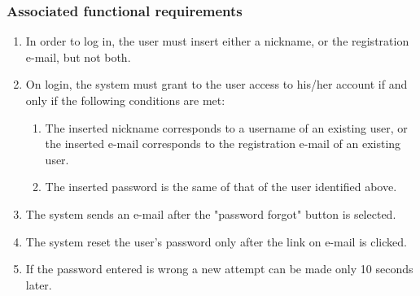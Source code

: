 \subsubsection{Associated functional requirements}
\begin{enumerate}
    \item In order to log in, the user must insert either a nickname, or the registration e-mail, but not both.
    \item On login, the system must grant to the user access to his/her account if and only if the following conditions are met:
    \begin{enumerate} 
    	\item The inserted nickname corresponds to a username of an existing user, or the inserted e-mail corresponds to the registration e-mail of an existing user.
	\item The inserted password is the same of that of the user identified above.
    \end{enumerate}
    \item The system sends an e-mail after the "password forgot" button is selected.
    \item The system reset the user's password only after the link on e-mail is clicked.
    \item If the password entered is wrong a new attempt can be made only 10 seconds later.
  
\end{enumerate}